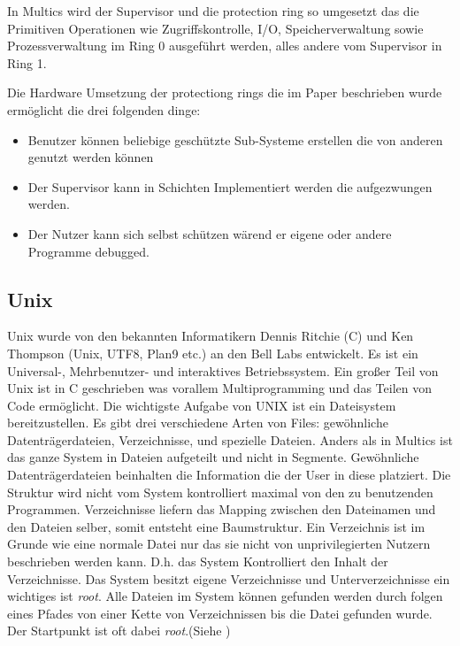 \documentclass[9pt,technote]{IEEEtran}
\begin{document}
    In Multics wird der Supervisor und die protection ring so umgesetzt das die Primitiven Operationen wie Zugriffskontrolle, I/O, Speicherverwaltung sowie
    Prozessverwaltung im Ring 0 ausgef\"uhrt werden, alles andere vom Supervisor in Ring 1.
    
    Die Hardware Umsetzung der protectiong rings die im Paper \cite{inproc:protec-rings} beschrieben wurde erm\"oglicht die drei folgenden dinge:
    \begin{itemize}
      \item Benutzer k\"onnen beliebige gesch\"utzte Sub-Systeme erstellen die von anderen genutzt werden k\"onnen
      \item Der Supervisor kann in Schichten Implementiert werden die aufgezwungen werden.
      \item Der Nutzer kann sich selbst sch\"utzen w\"arend er eigene oder andere Programme debugged.
    \end{itemize}
    
    
  \subsection{Unix}
    Unix wurde von den bekannten Informatikern Dennis Ritchie (C) und Ken Thompson (Unix, UTF8, Plan9 etc.) an den Bell Labs entwickelt.
    Es ist ein Universal-, Mehrbenutzer- und interaktives Betriebssystem. Ein gro\ss er Teil von Unix ist in C geschrieben was vorallem Multiprogramming
    und das Teilen von Code erm\"oglicht. Die wichtigste Aufgabe von UNIX ist ein Dateisystem bereitzustellen. Es gibt drei verschiedene Arten von Files:
    gew\"ohnliche Datentr\"agerdateien, Verzeichnisse, und spezielle Dateien. Anders als in Multics ist das ganze System in Dateien aufgeteilt und nicht in
    Segmente. Gew\"ohnliche Datentr\"agerdateien beinhalten die Information die der User in diese platziert. Die Struktur wird nicht vom System kontrolliert maximal
    von den zu benutzenden Programmen. Verzeichnisse liefern das Mapping zwischen den Dateinamen und den Dateien selber, somit entsteht eine Baumstruktur.
    Ein Verzeichnis ist im Grunde wie eine normale Datei nur das sie nicht von unprivilegierten Nutzern beschrieben werden kann. D.h. das System Kontrolliert den
    Inhalt der Verzeichnisse. Das System besitzt eigene Verzeichnisse und Unterverzeichnisse ein wichtiges ist \textit{root}. Alle Dateien im System k\"onnen gefunden 
    werden durch folgen eines Pfades von einer Kette von Verzeichnissen bis die Datei gefunden wurde. Der Startpunkt ist oft dabei \textit{root}.(Siehe \cite[S. 366]{inproc:unix})
    
\end{document}
